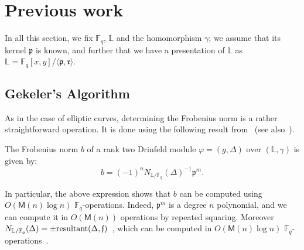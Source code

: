\documentclass[sigconf]{acmart}
\newcommand{\M}{\mathsf{M}}
\newcommand{\F}{\mathbb{F}}
\renewcommand{\L}{\mathbb{L}}
\newcommand{\frakf}{\mathfrak{f}}
\newcommand{\frakp}{\mathfrak{p}}
\newcommand{\frakr}{\mathfrak{r}}
\begin{document}



\section{Previous work}

In all this section, we fix $\F_q$, $\L$ and the homomorphism
$\gamma$; we assume that its kernel $\frakp$ is known, and further
that we have a presentation of $\L$ as $\L=\F_q[x,y]/\langle
\frakp,\frakr\rangle$.


\subsection{Gekeler's Algorithm}

As in the case of elliptic curves, determining the Frobenius norm is a
rather straightforward operation. It is done using the following
result from~\cite[Th.~2.11]{frobdist} (see also~\cite{Hsia00}).

\begin{proposition}\label{frobnorm}
  The Frobenius norm $b$ of a rank two Drinfeld module $\varphi=(g,\Delta)$ 
  over $(\L,\gamma)$ is
  given by:
  \[b = (-1)^n N_{\L/\F_q}(\Delta)^{-1}\frakp^m.\]
\end{proposition}
In particular, the above expression shows that $b$ can be computed using
$O(\M(n)\log n)$ $\F_q$-operations. Indeed, $\frakp^m$ is a degree $n$
polynomial, and we can compute it in $O(\M(n))$ operations by
repeated squaring. Moreover $N_{\L/\F_q}(\Delta) = \pm
\textnormal{resultant}(\Delta,\frakf)$~\cite{Pohst:1989:AAN:76692}, which
can be computed in $O(\M(n)\log n)$
$\F_q$-operations~\cite{Gathen:2003:MCA:945759}.
\end{document}
